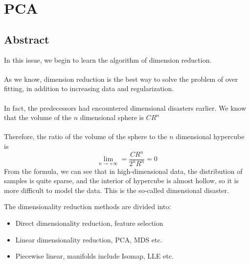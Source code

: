 \documentclass{report}
\begin{document}
\chapter{PCA}
\section{Abstract}
In this issue, we begin to learn the algorithm of dimension reduction.\\\\
As we know, dimension reduction is the best way to solve the problem of over fitting, in addition to increasing data and regularization.\\\\
In fact, the predecessors had encountered dimensional disasters earlier. We know that the volume of the $n $ dimensional sphere is $CR^n$\\\\
Therefore, the ratio of the volume of the sphere to the $n$ dimensional hypercube is
$$
\lim_{n \to +\infty}=\frac{CR^n}{2^n R^n}=0
$$
From the formula, we can see that in high-dimensional data, the distribution of samples is quite sparse, and the interior of hypercube is almost hollow, so it is more difficult to model the data. This is the so-called dimensional disaster.

The dimensionality reduction methods are divided into:
\begin{itemize}
	\item Direct dimensionality reduction, feature selection
	\item Linear dimensionality reduction, PCA, MDS etc.
	\item Piecewise linear, manifolds include Isomap, LLE etc.
\end{itemize}
\newpage
\end{document}
